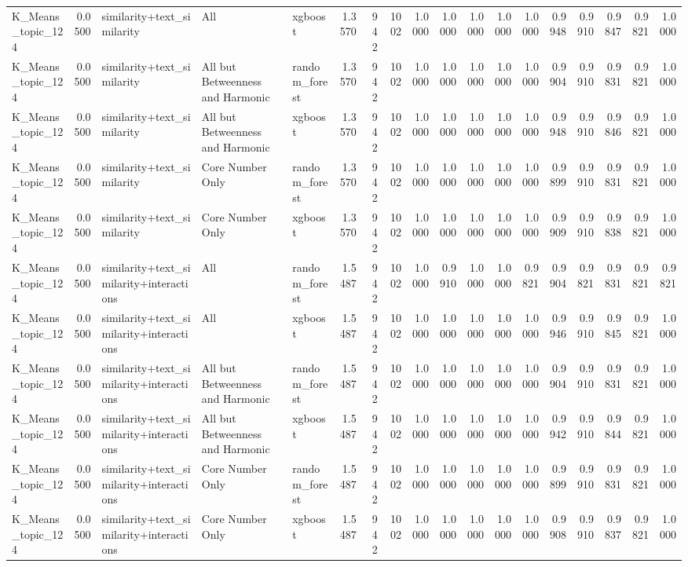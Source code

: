 \begin{tabular}{lrlllrrrrrrrrrrrrr}
K_Means_topic_124 & 0.0500 & similarity+text_similarity & All & xgboost & 1.3570 & 942 & 1002 & 1.0000 & 1.0000 & 1.0000 & 1.0000 & 1.0000 & 0.9948 & 0.9910 & 0.9847 & 0.9821 & 1.0000 \\
K_Means_topic_124 & 0.0500 & similarity+text_similarity & All but Betweenness and Harmonic & random_forest & 1.3570 & 942 & 1002 & 1.0000 & 1.0000 & 1.0000 & 1.0000 & 1.0000 & 0.9904 & 0.9910 & 0.9831 & 0.9821 & 1.0000 \\
K_Means_topic_124 & 0.0500 & similarity+text_similarity & All but Betweenness and Harmonic & xgboost & 1.3570 & 942 & 1002 & 1.0000 & 1.0000 & 1.0000 & 1.0000 & 1.0000 & 0.9948 & 0.9910 & 0.9846 & 0.9821 & 1.0000 \\
K_Means_topic_124 & 0.0500 & similarity+text_similarity & Core Number Only & random_forest & 1.3570 & 942 & 1002 & 1.0000 & 1.0000 & 1.0000 & 1.0000 & 1.0000 & 0.9899 & 0.9910 & 0.9831 & 0.9821 & 1.0000 \\
K_Means_topic_124 & 0.0500 & similarity+text_similarity & Core Number Only & xgboost & 1.3570 & 942 & 1002 & 1.0000 & 1.0000 & 1.0000 & 1.0000 & 1.0000 & 0.9909 & 0.9910 & 0.9838 & 0.9821 & 1.0000 \\
K_Means_topic_124 & 0.0500 & similarity+text_similarity+interactions & All & random_forest & 1.5487 & 942 & 1002 & 1.0000 & 0.9910 & 1.0000 & 1.0000 & 0.9821 & 0.9904 & 0.9821 & 0.9831 & 0.9821 & 0.9821 \\
K_Means_topic_124 & 0.0500 & similarity+text_similarity+interactions & All & xgboost & 1.5487 & 942 & 1002 & 1.0000 & 1.0000 & 1.0000 & 1.0000 & 1.0000 & 0.9946 & 0.9910 & 0.9845 & 0.9821 & 1.0000 \\
K_Means_topic_124 & 0.0500 & similarity+text_similarity+interactions & All but Betweenness and Harmonic & random_forest & 1.5487 & 942 & 1002 & 1.0000 & 1.0000 & 1.0000 & 1.0000 & 1.0000 & 0.9904 & 0.9910 & 0.9831 & 0.9821 & 1.0000 \\
K_Means_topic_124 & 0.0500 & similarity+text_similarity+interactions & All but Betweenness and Harmonic & xgboost & 1.5487 & 942 & 1002 & 1.0000 & 1.0000 & 1.0000 & 1.0000 & 1.0000 & 0.9942 & 0.9910 & 0.9844 & 0.9821 & 1.0000 \\
K_Means_topic_124 & 0.0500 & similarity+text_similarity+interactions & Core Number Only & random_forest & 1.5487 & 942 & 1002 & 1.0000 & 1.0000 & 1.0000 & 1.0000 & 1.0000 & 0.9899 & 0.9910 & 0.9831 & 0.9821 & 1.0000 \\
K_Means_topic_124 & 0.0500 & similarity+text_similarity+interactions & Core Number Only & xgboost & 1.5487 & 942 & 1002 & 1.0000 & 1.0000 & 1.0000 & 1.0000 & 1.0000 & 0.9908 & 0.9910 & 0.9837 & 0.9821 & 1.0000 \\

\end{tabular}
